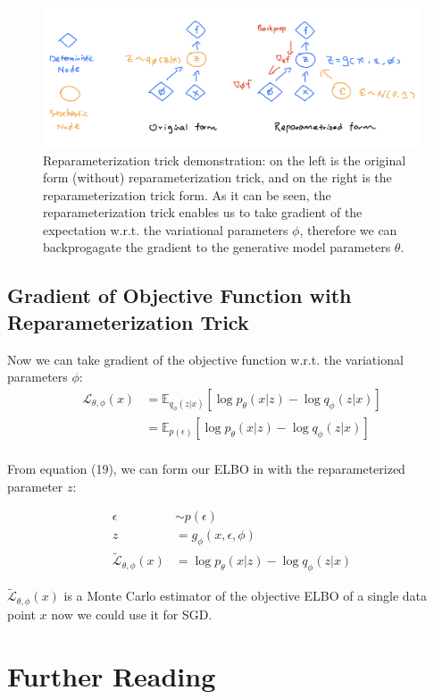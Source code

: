 \documentclass[11pt]{article}
\theoremstyle{definition}
\begin{document}
\begin{figure}[h]
\includegraphics*[width=\textwidth]{reparam-graph.png}
\caption{Reparameterization trick demonstration: on the left is the original form (without) reparameterization trick, and on the right is the reparameterization trick form. As it can be seen, the reparameterization trick enables us to take gradient of the expectation w.r.t. the variational parameters $\phi$, therefore we can backprogagate the gradient to the generative model parameters $\theta$.}
\end{figure}

\subsection{Gradient of Objective Function with Reparameterization Trick}

Now we can take gradient of the objective function w.r.t. the variational parameters $\phi$:
\begin{align}
    \mathcal{L}_{\theta, \phi}(x) &= \mathbb{E}_{q_\phi(z|x)}[\log p_\theta(x|z) - \log q_\phi(z|x)]\\
    &= \mathbb{E}_{p(\epsilon)}[\log p_\theta(x|z) - \log q_\phi(z|x)]\\
\end{align}

From equation (19), we can form our ELBO in with the reparameterized parameter $z$:

\begin{align}
    \epsilon &\sim p(\epsilon)\\
    z &= g_\phi(x, \epsilon, \phi)\\
    \mathcal{\tilde{L}}_{\theta, \phi}(x) &= \log p_\theta(x|z) - \log q_\phi(z|x)
\end{align}

$\mathcal{\tilde{L}}_{\theta, \phi}(x)$ is a Monte Carlo estimator of the objective ELBO of a single data point $x$ now we could use it for SGD.

\section{Further Reading}
\end{document}
